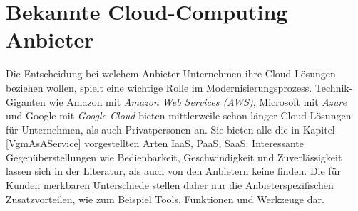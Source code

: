 \section{Bekannte Cloud-Computing Anbieter}
\label{VgmPublicProvider}
Die Entscheidung bei welchem Anbieter Unternehmen ihre Cloud-Lösungen beziehen wollen, spielt  eine wichtige Rolle im Modernisierungsprozess. Technik-Giganten wie Amazon mit \textit{Amazon Web Services (AWS)}, Microsoft mit \textit{Azure} und Google mit \textit{Google Cloud }bieten mittlerweile schon länger Cloud-Lösungen für Unternehmen, als auch Privatpersonen an. Sie bieten alle die in Kapitel \ref{VgmAsAService}  vorgestellten Arten \acs{IaaS}, \acs{PaaS}, \acs{SaaS}. 
Interessante Gegenüberstellungen wie Bedienbarkeit, Geschwindigkeit und Zuverlässigkeit lassen sich in der Literatur, als auch von den Anbietern keine finden. Die für Kunden merkbaren Unterschiede stellen daher nur die Anbieterspezifischen Zusatzvorteilen, wie zum Beispiel Tools, Funktionen und Werkzeuge dar. 




